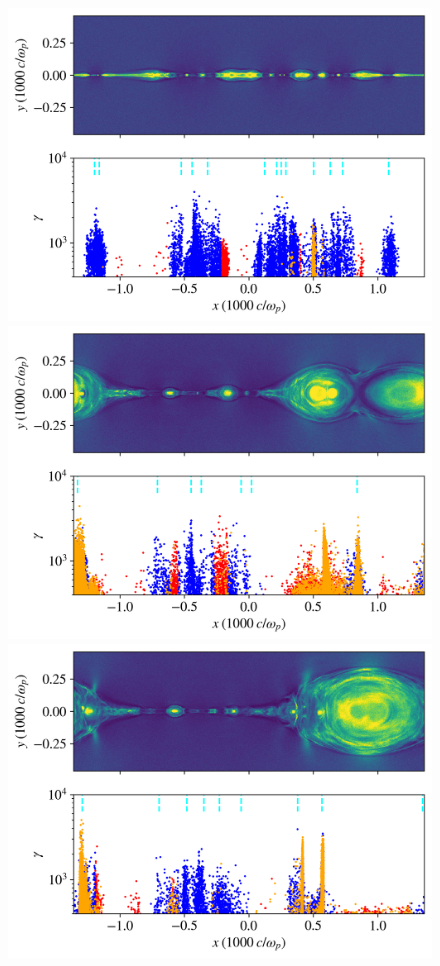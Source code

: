 \documentclass[iop,twocolappendix]{emulateapj}
\begin{document}
\begin{figure}[!h]
	{
		\includegraphics[width=\linewidth]{untriggered_bguide0_snapshot8.png}
	}
	\newline
	{
		\includegraphics[width=\linewidth]{untriggered_bguide0_snapshot25.png}
	}
	\newline
	{
		\includegraphics[width=\linewidth]{untriggered_bguide0_snapshot35.png}
	}
	

\end{figure}
\end{document}
